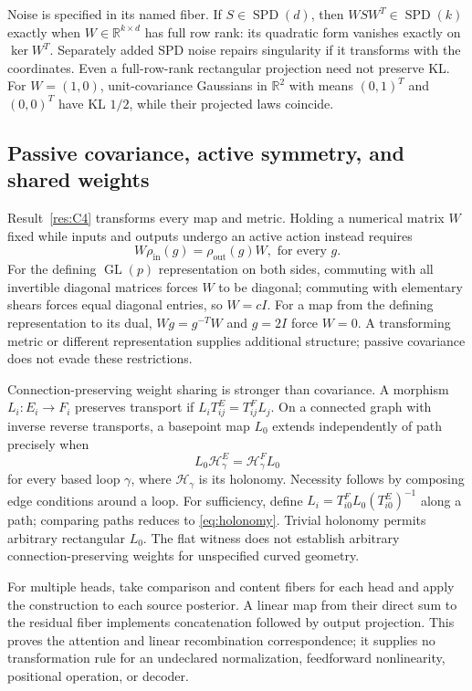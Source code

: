 \documentclass[11pt]{article}
\newcommand{\R}{\mathbb{R}}
\newcommand{\SPD}{\operatorname{SPD}}
\newcommand{\GL}{\operatorname{GL}}
\begin{document}
Noise is specified in its named fiber. If $S\in\SPD(d)$, then $WSW^T\in\SPD(k)$ exactly when $W\in\R^{k\times d}$ has full row rank: its quadratic form vanishes exactly on $\ker W^T$. Separately added SPD noise repairs singularity if it transforms with the coordinates. Even a full-row-rank rectangular projection need not preserve KL. For $W=(1,0)$, unit-covariance Gaussians in $\R^2$ with means $(0,1)^T$ and $(0,0)^T$ have KL $1/2$, while their projected laws coincide.

\subsection{Passive covariance, active symmetry, and shared weights}
\label{sec:active}
Result~\ref{res:C4} transforms every map and metric. Holding a numerical matrix $W$ fixed while inputs and outputs undergo an active action instead requires
\begin{equation}
W\rho_{\mathrm{in}}(g)=\rho_{\mathrm{out}}(g)W,\text{ for every }g.
\label{eq:intertwiner}
\end{equation}
For the defining $\GL(p)$ representation on both sides, commuting with all invertible diagonal matrices forces $W$ to be diagonal; commuting with elementary shears forces equal diagonal entries, so $W=cI$. For a map from the defining representation to its dual, $Wg=g^{-T}W$ and $g=2I$ force $W=0$. A transforming metric or different representation supplies additional structure; passive covariance does not evade these restrictions.

Connection-preserving weight sharing is stronger than covariance. A morphism $L_i:E_i\to F_i$ preserves transport if $L_iT^E_{ij}=T^F_{ij}L_j$. On a connected graph with inverse reverse transports, a basepoint map $L_0$ extends independently of path precisely when
\begin{equation}
L_0\mathcal H^E_\gamma=\mathcal H^F_\gamma L_0
\label{eq:holonomy}
\end{equation}
for every based loop $\gamma$, where $\mathcal H_\gamma$ is its holonomy. Necessity follows by composing edge conditions around a loop. For sufficiency, define $L_i=T^F_{i0}L_0(T^E_{i0})^{-1}$ along a path; comparing paths reduces to \eqref{eq:holonomy}. Trivial holonomy permits arbitrary rectangular $L_0$. The flat witness does not establish arbitrary connection-preserving weights for unspecified curved geometry.

For multiple heads, take comparison and content fibers for each head and apply the construction to each source posterior. A linear map from their direct sum to the residual fiber implements concatenation followed by output projection. This proves the attention and linear recombination correspondence; it supplies no transformation rule for an undeclared normalization, feedforward nonlinearity, positional operation, or decoder.
\end{document}
